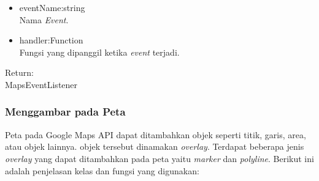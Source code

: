 \begin{enumerate}
\begin{itemize}
    \item eventName:string\\
    Nama \textit{Event}.
    
    \item handler:Function\\
    Fungsi yang dipanggil ketika \textit{event} terjadi.
  \end{itemize}
  Return:\\
  MapsEventListener
\end{enumerate}

\subsubsection{Menggambar pada Peta}
Peta pada Google Maps API dapat ditambahkan objek seperti titik, garis, area,
atau objek lainnya. objek tersebut dinamakan \textit{overlay}. Terdapat beberapa
jenis \textit{overlay} yang dapat ditambahkan pada peta yaitu \textit{marker}
dan \textit{polyline}. Berikut ini adalah penjelasan kelas dan fungsi yang
digunakan:
